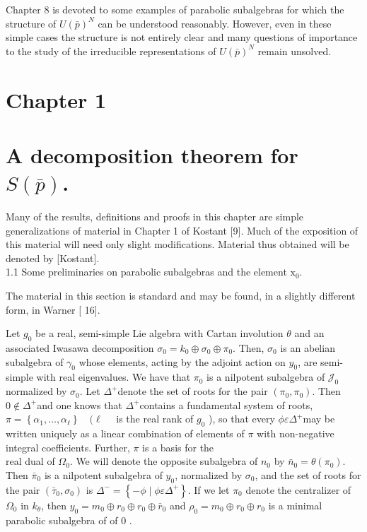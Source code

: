 \documentclass[10pt]{article}
\begin{document}
Chapter 8 is devoted to some examples of parabolic subalgebras for which the structure of $U(\bar{p})^{N}$ can be understood reasonably. However, even in these simple cases the structure is not entirely clear and many questions of importance to the study of the irreducible representations of $U(\bar{p})^{N}$ remain unsolved.

\section{Chapter 1}
\section{A decomposition theorem for $S(\bar{p})$.}
Many of the results, definitions and proofs in this chapter are simple generalizations of material in Chapter 1 of Kostant [9]. Much of the exposition of this material will need only slight modifications. Material thus obtained will be denoted by [Kostant].\\
1.1 Some preliminaries on parabolic subalgebras and the element $\mathrm{x}_{0}$.

The material in this section is standard and may be found, in a slightly different form, in Warner [ 16].

Let $g_{0}$ be a real, semi-simple Lie algebra with Cartan involution $\theta$ and an associated Iwasawa decomposition $\sigma_{0}=k_{0} \oplus \sigma_{0} \oplus \pi_{0}$. Then, $\sigma_{0}$ is an abelian subalgebra of $\gamma_{0}$ whose elements, acting by the adjoint action on $y_{0}$, are semi-simple with real eigenvalues. We have that $\pi_{0}$ is a nilpotent subalgebra of $\mathcal{J}_{0}$ normalized by $\sigma_{0}$. Let $\Delta^{+}$denote the set of roots for the pair $\left(\pi_{0}, \pi_{0}\right)$. Then $0 \notin \Delta^{+}$and one knows that $\Delta^{+}$contains a fundamental system of roots, $\pi=\left\{\alpha_{1}, \ldots, \alpha_{\ell}\right\} \quad(\ell \quad$ is the real rank of $g_{0}$ ), so that every $\phi \varepsilon \Delta^{+}$may be written uniquely as a linear combination of elements of $\pi$ with non-negative integral coefficients. Further, $\pi$ is a basis for the\\
real dual of $\Omega_{0}$. We will denote the opposite subalgebra of $n_{0}$ by $\bar{n}_{0}=\theta\left(\pi_{0}\right)$. Then $\bar{\pi}_{0}$ is a nilpotent subalgebra of $y_{0}$, normalized by $\sigma_{0}$, and the set of roots for the pair $\left(\bar{\tau}_{0}, \sigma_{0}\right)$ is $\Delta^{-}=\left\{-\phi \mid \phi \varepsilon \Delta^{+}\right\}$. If we let $\pi_{0}$ denote the centralizer of $\Omega_{0}$ in $k_{\theta}$, then $y_{0}=m_{0} \oplus r_{0} \oplus r_{0} \oplus \bar{r}_{0}$ and $\rho_{0}=m_{0} \oplus r_{0} \oplus r_{0}$ is a minimal parabolic subalgebra of of 0 .
\end{document}
